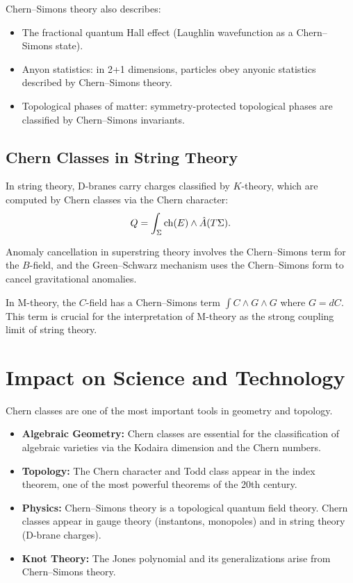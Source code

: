 Chern--Simons theory also describes:
\begin{itemize}
    \item The fractional quantum Hall effect (Laughlin wavefunction as a Chern--Simons state).
    \item Anyon statistics: in 2+1 dimensions, particles obey anyonic statistics described by Chern--Simons theory.
    \item Topological phases of matter: symmetry-protected topological phases are classified by Chern--Simons invariants.
\end{itemize}

\subsection{Chern Classes in String Theory}

In string theory, D-branes carry charges classified by $K$-theory, which are computed by Chern classes via the Chern character:
\[
Q = \int_{\Sigma} \operatorname{ch}(E) \wedge \hat{A}(T\Sigma).
\]

Anomaly cancellation in superstring theory involves the Chern--Simons term for the $B$-field, and the Green--Schwarz mechanism uses the Chern--Simons form to cancel gravitational anomalies.

In M-theory, the $C$-field has a Chern--Simons term $\int C \wedge G \wedge G$ where $G = dC$. This term is crucial for the interpretation of M-theory as the strong coupling limit of string theory.

\section{Impact on Science and Technology}

Chern classes are one of the most important tools in geometry and topology.
\begin{itemize}
    \item \textbf{Algebraic Geometry:} Chern classes are essential for the classification of algebraic varieties via the Kodaira dimension and the Chern numbers.
    \item \textbf{Topology:} The Chern character and Todd class appear in the index theorem, one of the most powerful theorems of the 20th century.
    \item \textbf{Physics:} Chern--Simons theory is a topological quantum field theory. Chern classes appear in gauge theory (instantons, monopoles) and in string theory (D-brane charges).
    \item \textbf{Knot Theory:} The Jones polynomial and its generalizations arise from Chern--Simons theory.
\end{itemize}

